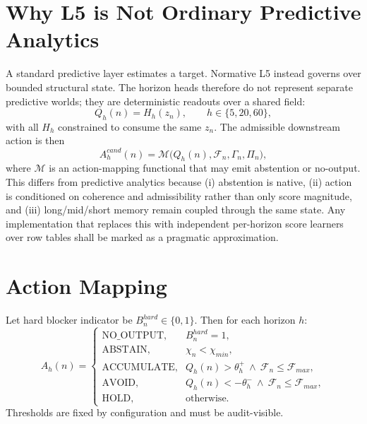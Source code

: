 \section{Why L5 is Not Ordinary Predictive Analytics}

A standard predictive layer estimates a target. Normative L5 instead governs over bounded structural state. The horizon heads therefore do not represent separate predictive worlds; they are deterministic readouts over a shared field:
\[
Q_h(n)=H_h(z_n),\qquad h\in\{5,20,60\},
\]
with all $H_h$ constrained to consume the same $z_n$. The admissible downstream action is then
\[
A_h^{cand}(n)=\mathcal{M}\big(Q_h(n),\mathcal{F}_n,\Gamma_n,\Pi_n\big),
\]
where $\mathcal{M}$ is an action-mapping functional that may emit abstention or no-output. This differs from predictive analytics because (i) abstention is native, (ii) action is conditioned on coherence and admissibility rather than only score magnitude, and (iii) long/mid/short memory remain coupled through the same state. Any implementation that replaces this with independent per-horizon score learners over row tables shall be marked as a pragmatic approximation.

\section{Action Mapping}

Let hard blocker indicator be $B_n^{hard}\in\{0,1\}$. Then for each horizon $h$:
\[
A_h(n)=\begin{cases}
\text{NO\_OUTPUT}, & B_n^{hard}=1,\\
\text{ABSTAIN}, & \chi_n<\chi_{min},\\
\text{ACCUMULATE}, & Q_h(n)>\theta_h^{+}\ \wedge\ \mathcal{F}_n\le\mathcal{F}_{max},\\
\text{AVOID}, & Q_h(n)<-\theta_h^{-}\ \wedge\ \mathcal{F}_n\le\mathcal{F}_{max},\\
\text{HOLD}, & \text{otherwise.}
\end{cases}
\]
Thresholds are fixed by configuration and must be audit-visible.

